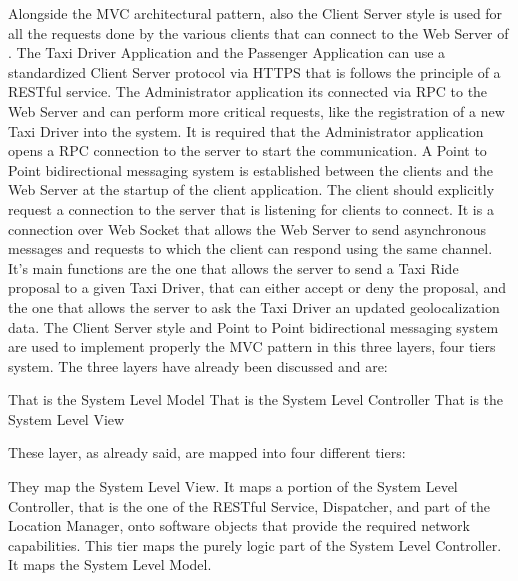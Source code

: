 Alongside the MVC architectural pattern, also the Client Server style is used for all the requests done by the various clients that can connect to the Web Server of \myTaxiService{}. The Taxi Driver Application and the Passenger Application can use a standardized Client Server protocol via HTTPS that is follows the principle of a RESTful service. The Administrator application its connected via RPC to the Web Server and can perform more critical requests, like the registration of a new Taxi Driver into the system. It is required that the Administrator application opens a RPC connection to the server to start the communication.
A Point to Point bidirectional messaging system is established between the clients and the Web Server at the startup of the client application. The client should explicitly request a connection to the server that is listening for clients to connect. It is a connection over Web Socket that allows the Web Server to send asynchronous messages and requests to which the client can respond using the same channel. It's main functions are the one that allows the server to send a Taxi Ride proposal to a given Taxi Driver, that can either accept or deny the proposal, and the one that allows the server to ask the Taxi Driver an updated geolocalization data.
The Client Server style and Point to Point bidirectional messaging system are used to implement properly the MVC pattern in this three layers, four tiers system.
The three layers have already been discussed and are:
\begin{itemize}
	 That is the System Level Model
	 That is the System Level Controller
	 That is the System Level View
\end{itemize}
These layer, as already said, are mapped into four different tiers:
\begin{itemize}
	 They map the System Level View.
	 It maps a portion of the System Level Controller, that is the one of the RESTful Service, Dispatcher, and part of the Location Manager, onto software objects that provide the required network capabilities.
	 This tier maps the purely logic part of the System Level Controller.
	 It maps the System Level Model.
\end{itemize}
